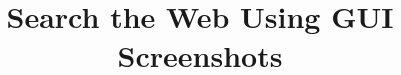 \documentclass{www2010-submission}
\begin{document}
%
\title{Search the Web Using GUI Screenshots}
%
%

%

\end{document}
